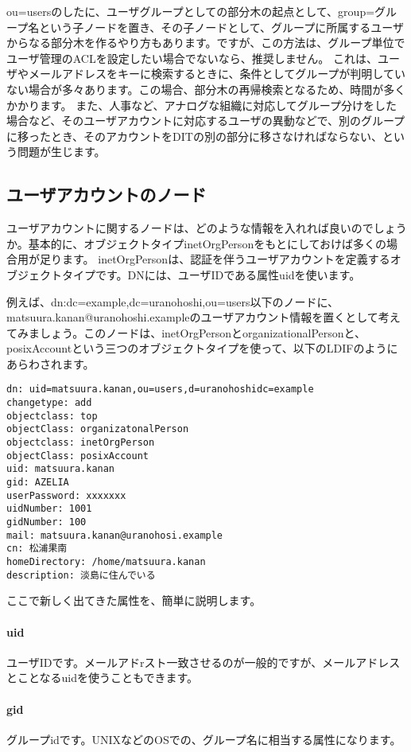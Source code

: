 ou=usersのしたに、ユーザグループとしての部分木の起点として、group=グループ名という子ノードを置き、その子ノードとして、グループに所属するユーザからなる部分木を作るやり方もあります。ですが、この方法は、グループ単位でユーザ管理のACLを設定したい場合でないなら、推奨しません。
これは、ユーザやメールアドレスをキーに検索するときに、条件としてグループが判明していない場合が多々あります。この場合、部分木の再帰検索となるため、時間が多くかかります。
また、人事など、アナログな組織に対応してグループ分けをした場合など、そのユーザアカウントに対応するユーザの異動などで、別のグループに移ったとき、そのアカウントをDITの別の部分に移さなければならない、という問題が生じます。

\subsection{ユーザアカウントのノード}

ユーザアカウントに関するノードは、どのような情報を入れれば良いのでしょうか。基本的に、オブジェクトタイプinetOrgPersonをもとにしておけば多くの場合用が足ります。
inetOrgPersonは、認証を伴うユーザアカウントを定義するオブジェクトタイプです。DNには、ユーザIDである属性uidを使います。

例えば、dn:dc=example,dc=uranohoshi,ou=users以下のノードに、matsuura.kanan@uranohoshi.exampleのユーザアカウント情報を置くとして考えてみましょう。このノードは、inetOrgPersonとorganizationalPersonと、posixAccountという三つのオブジェクトタイプを使って、以下のLDIFのようにあらわされます。

\begin{verbatim}
dn: uid=matsuura.kanan,ou=users,d=uranohoshidc=example
changetype: add
objectclass: top
objectClass: organizatonalPerson
objectclass: inetOrgPerson
objectClass: posixAccount
uid: matsuura.kanan
gid: AZELIA
userPassword: xxxxxxx
uidNumber: 1001
gidNumber: 100
mail: matsuura.kanan@uranohosi.example
cn: 松浦果南
homeDirectory: /home/matsuura.kanan
description: 淡島に住んでいる
\end{verbatim}

ここで新しく出てきた属性を、簡単に説明します。

\paragraph{uid}
ユーザIDです。メールアドrスト一致させるのが一般的ですが、メールアドレスとことなるuidを使うこともできます。

\paragraph{gid}
グループidです。UNIXなどのOSでの、グループ名に相当する属性になります。

